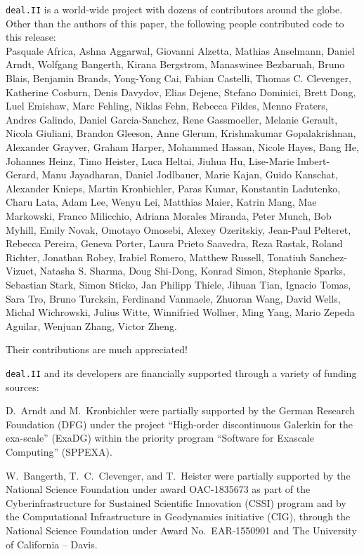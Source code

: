 \documentclass{ansarticle-preprint}
\newcommand{\specialword}[1]{\texttt{#1}}
\newcommand{\dealii}{{\specialword{deal.II}}\xspace}
\begin{document}
\dealii is a world-wide project with dozens of contributors around the
globe. Other than the authors of this paper, the following people
contributed code to this release:\\
Pasquale Africa,
Ashna Aggarwal,
Giovanni Alzetta,
Mathias Anselmann,
Daniel Arndt,
Wolfgang Bangerth,
Kirana Bergstrom,
Manaswinee Bezbaruah,
Bruno Blais,
Benjamin Brands,
Yong-Yong Cai,
Fabian Castelli,
Thomas C. Clevenger,
Katherine Cosburn,
Denis Davydov,
Elias Dejene,
Stefano Dominici,
Brett Dong,
Luel Emishaw,
Marc Fehling,
Niklas Fehn,
Rebecca Fildes,
Menno Fraters,
Andres Galindo,
Daniel Garcia-Sanchez,
Rene Gassmoeller,
Melanie Gerault,
Nicola Giuliani,
Brandon Gleeson,
Anne Glerum,
Krishnakumar Gopalakrishnan,
Alexander Grayver,
Graham Harper,
Mohammed Hassan,
Nicole Hayes,
Bang He,
Johannes Heinz,
Timo Heister,
Luca Heltai,
Jiuhua Hu,
Lise-Marie Imbert-Gerard,
Manu Jayadharan,
Daniel Jodlbauer,
Marie Kajan,
Guido Kanschat,
Alexander Knieps,
Martin Kronbichler,
Paras Kumar,
Konstantin Ladutenko,
Charu Lata,
Adam Lee,
Wenyu Lei,
Matthias Maier,
Katrin Mang,
Mae Markowski,
Franco Milicchio,
Adriana Morales Miranda,
Peter Munch,
Bob Myhill,
Emily Novak,
Omotayo Omosebi,
Alexey Ozeritskiy,
Jean-Paul Pelteret,
Rebecca Pereira,
Geneva Porter,
Laura Prieto Saavedra,
Reza Rastak,
Roland Richter,
Jonathan Robey,
Irabiel Romero,
Matthew Russell,
Tonatiuh Sanchez-Vizuet,
Natasha S. Sharma,
Doug Shi-Dong,
Konrad Simon,
Stephanie Sparks,
Sebastian Stark,
Simon Sticko,
Jan Philipp Thiele,
Jihuan Tian,
Ignacio Tomas,
Sara Tro,
Bruno Turcksin,
Ferdinand Vanmaele,
Zhuoran Wang,
David Wells,
Michal Wichrowski,
Julius Witte,
Winnifried Wollner,
Ming Yang,
Mario Zepeda Aguilar,
Wenjuan Zhang,
Victor Zheng.

Their contributions are much appreciated!


\bigskip

\dealii and its developers are financially supported through a
variety of funding sources:

D.~Arndt and M.~Kronbichler were partially supported by the German
Research Foundation (DFG) under the project ``High-order discontinuous
Galerkin for the exa-scale'' (\mbox{ExaDG}) within the priority program ``Software
for Exascale Computing'' (SPPEXA).

W.~Bangerth, T.~C.~Clevenger, and T.~Heister were partially
supported by the National Science Foundation under award OAC-1835673
as part of the Cyberinfrastructure for Sustained Scientific Innovation (CSSI)
program  and by the Computational Infrastructure
in Geodynamics initiative (CIG), through the National Science
Foundation under Award No.~EAR-1550901 and The
University of California -- Davis.
\end{document}

